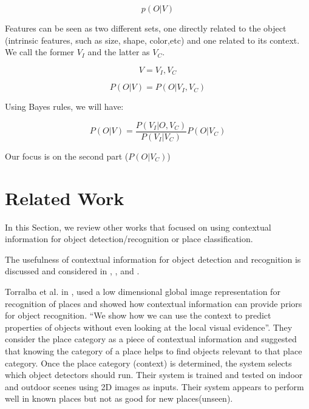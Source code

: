 \begin{equation}
 \label{ObjectDetction.eq}
    p(O|V)
\end{equation}

Features can be seen as two different sets, one directly related to the object (intrinsic features, such as size, shape, color,etc) and one related to its context. We call the former $V_I$ and the latter as $V_C$.

\begin{equation}
 \label{FeaturesSet.eq}
    V = {V_I,V_C}
\end{equation}

\begin{equation}
 \label{ObjectDetctionExtended.eq}
    P(O|V) = P(O|V_I,V_C)
\end{equation}

Using Bayes rules, we will have:

\begin{equation}
 \label{ObjectDetctionBayesapplied.eq}
    P(O|V) = \frac{P(V_I|O,V_C)}{P(V_I|V_C)} P(O|V_C)
\end{equation}

Our focus is on the second part ($P(O|V_C)$)


\section {Related Work}
\label{RelatedWork.sec}
     In this Section, we review other works that focused on using contextual information for object detection/recognition 
     or place classification.
     
The usefulness of contextual information for object detection and recognition is discussed and
considered in \cite{TrollbaContexBased}, \cite{TorralbaContextualPriming}, \cite{PerkoLeonardisContextDriven}
and \cite{aydemir2012_3Dcontext}.

Torralba et al. in \cite{TrollbaContexBased}, used a low dimensional global image 
     representation for recognition of places and showed how contextual information can provide priors for object recognition. ``We show how we can use the context to predict properties of objects without even looking at the local visual evidence''. They consider the place category as a piece of contextual information and suggested that knowing the category of a place helps to find objects relevant to that place category. Once the place category (context) is determined, the system selects which object detectors should run. Their system is trained and tested on indoor and outdoor scenes using 2D images as inputs. Their system appears to perform well in known places but not as good for new places(unseen).
%      
     
